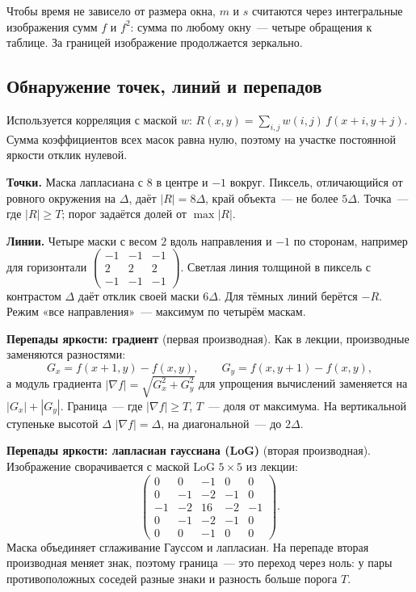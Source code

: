 \documentclass[11pt,a4paper]{article}
\begin{document}
Чтобы время не зависело от размера окна, $m$ и $s$ считаются через
интегральные изображения сумм $f$ и $f^2$: сумма по любому окну~— четыре
обращения к таблице. За границей изображение продолжается зеркально.

\subsection{Обнаружение точек, линий и перепадов}
Используется корреляция с маской $w$:
$R(x, y) = \sum_{i,j} w(i, j)\, f(x + i, y + j)$. Сумма коэффициентов всех
масок равна нулю, поэтому на участке постоянной яркости отклик нулевой.

\textbf{Точки.} Маска лапласиана с 8 в центре и $-1$ вокруг. Пиксель,
отличающийся от ровного окружения на $\Delta$, даёт $|R| = 8\Delta$, край
объекта~— не более $5\Delta$. Точка~— где $|R| \ge T$; порог задаётся долей
от $\max |R|$.

\textbf{Линии.} Четыре маски с весом $2$ вдоль направления и $-1$ по
сторонам, например для горизонтали
$\left(\begin{smallmatrix} -1 & -1 & -1 \\ 2 & 2 & 2 \\ -1 & -1 & -1 \end{smallmatrix}\right)$.
Светлая линия толщиной в пиксель с контрастом $\Delta$ даёт отклик своей
маски $6\Delta$. Для тёмных линий берётся $-R$. Режим «все направления»~— максимум
по четырём маскам.

\textbf{Перепады яркости: градиент} (первая производная). Как в лекции,
производные заменяются разностями:
\[
  G_x = f(x + 1, y) - f(x, y), \qquad G_y = f(x, y + 1) - f(x, y),
\]
а модуль градиента $|\nabla f| = \sqrt{G_x^2 + G_y^2}$ для упрощения
вычислений заменяется на $|G_x| + |G_y|$. Граница~— где $|\nabla f| \ge T$,
$T$~— доля от максимума. На вертикальной ступеньке высотой $\Delta$
$|\nabla f| = \Delta$, на диагональной~— до $2\Delta$.

\textbf{Перепады яркости: лапласиан гауссиана (LoG)} (вторая производная).
Изображение сворачивается с маской LoG $5 \times 5$ из лекции:
\[
  \begin{pmatrix}
    0 & 0 & -1 & 0 & 0 \\
    0 & -1 & -2 & -1 & 0 \\
    -1 & -2 & 16 & -2 & -1 \\
    0 & -1 & -2 & -1 & 0 \\
    0 & 0 & -1 & 0 & 0
  \end{pmatrix}.
\]
Маска объединяет сглаживание Гауссом и лапласиан. На перепаде вторая
производная меняет знак, поэтому граница~— это переход через ноль: у пары
противоположных соседей разные знаки и разность больше порога $T$.
\end{document}
